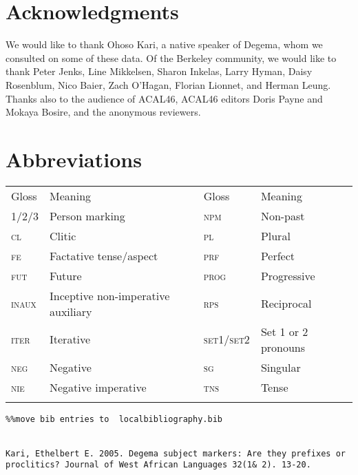 \documentclass[output=paper]{langsci/langscibook}
\begin{document}
\section*{Acknowledgments}


We would like to thank Ohoso Kari, a native speaker of Degema, whom we consulted on some of these data. Of the Berkeley community, we would like to thank Peter Jenks, Line Mikkelsen, Sharon Inkelas, Larry Hyman, Daisy Rosenblum, Nico Baier, Zach O’Hagan, Florian Lionnet, and Herman Leung. Thanks also to the audience of ACAL46, ACAL46 editors Doris Payne and Mokaya Bosire, and the anonymous reviewers.


\section*{Abbreviations}

\begin{tabularx}{\textwidth}{XXXX}
\lsptoprule

{Gloss} & {Meaning} & {Gloss} & {Meaning}\\
{\scshape 1/2/3} & {Person marking} & {\scshape npm} & {Non-past} \\
{\scshape cl} & {Clitic} & {\scshape pl} & {Plural} \\
{\scshape fe} & {Factative tense/aspect} & {\scshape prf} & {Perfect} \\
{\scshape fut} & {Future} & {\scshape prog} & {Progressive}\\
{\scshape inaux} & {Inceptive non-imperative auxiliary} & {\scshape rps} & {Reciprocal} \\
{\scshape iter} & {Iterative} & {\scshape set1/set2} & {Set 1 or 2 pronouns}\\
{\scshape neg} & {Negative} & {\scshape sg} & {Singular} \\
{\scshape nie} & {Negative imperative} & {\scshape tns} & {Tense} \\
\lspbottomrule
\end{tabularx}
 


\begin{verbatim}%%move bib entries to  localbibliography.bib 


Kari, Ethelbert E. 2005. Degema subject markers: Are they prefixes or proclitics? Journal of West African Languages 32(1& 2). 13-20.




\end{verbatim}
 
\printbibliography[heading=subbibliography,notkeyword=this]
\end{document}
